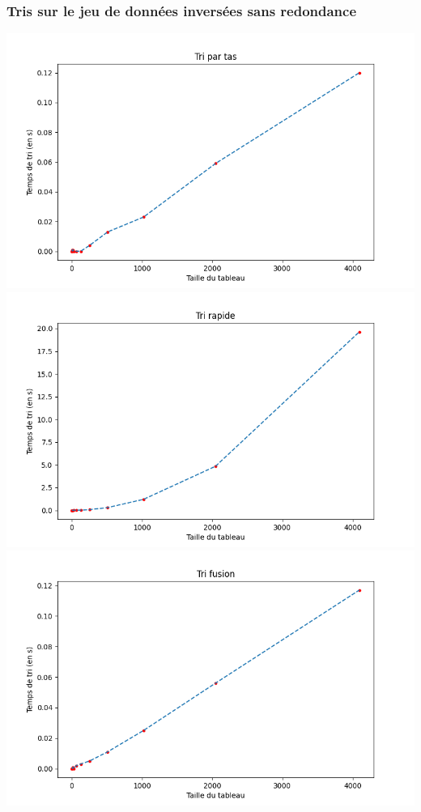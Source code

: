 \documentclass[11pt,a4paper]{article}
\begin{document}
\subsubsection{Tris sur le jeu de données inversées sans redondance}
    \includegraphics[scale = 0.7]{../Courbes/Valeurs_triées_inversement_avec_répétitions/Tri par tas.png}
    \includegraphics[scale = 0.7]{../Courbes/Valeurs_triées_inversement_avec_répétitions/Tri rapide.png}
    \includegraphics[scale = 0.7]{../Courbes/Valeurs_triées_inversement_avec_répétitions/Tri fusion.png}
\end{document}
